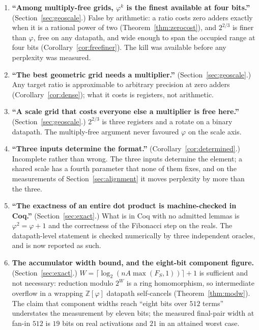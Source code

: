 \documentclass[11pt]{article}
\theoremstyle{definition}
\begin{document}
\begin{enumerate}[leftmargin=*,itemsep=3pt]

\item \textbf{``Among multiply-free grids, $\varphi^{k}$ is the finest available
at four bits.''} (Section~\ref{sec:geoscale}.) False by arithmetic: a ratio costs
zero adders exactly when it is a rational power of two
(Theorem~\ref{thm:zerocost}), and $2^{2/3}$ is finer than $\varphi$, free on any
datapath, and wide enough to span the occupied range at four bits
(Corollary~\ref{cor:freefiner}). The kill was available before any perplexity was
measured.

\item \textbf{``The best geometric grid needs a multiplier.''}
(Section~\ref{sec:geoscale}.) Any target ratio is approximable to arbitrary
precision at zero adders (Corollary~\ref{cor:dense}); what it costs is
registers, not arithmetic.

\item \textbf{``A scale grid that costs everyone else a multiplier is free
here.''} (Section~\ref{sec:geoscale}.) $2^{2/3}$ is three registers and a rotate
on a binary datapath. The multiply-free argument never favoured $\varphi$ on the
scale axis.

\item \textbf{``Three inputs determine the format.''}
(Corollary~\ref{cor:determined}.) Incomplete rather than wrong. The three inputs
determine the element; a shared scale has a fourth parameter that none of them
fixes, and on the measurements of Section~\ref{sec:alignment} it moves perplexity
by more than the three.

\item \textbf{``The exactness of an entire dot product is machine-checked in
Coq.''} (Section~\ref{sec:exact}.) What is in Coq with no admitted lemmas is
$\varphi^{2}=\varphi+1$ and the correctness of the Fibonacci step on the reals.
The datapath-level statement is checked numerically by three independent oracles,
and is now reported as such.

\item \textbf{The accumulator width bound, and the eight-bit component figure.}
(Section~\ref{sec:exact}.) $W = \lceil\log_2(nA\max(F_S,1))\rceil+1$ is
sufficient and not necessary: reduction modulo $2^{W}$ is a ring homomorphism, so
intermediate overflow in a wrapping $\mathbb{Z}[\varphi]$ datapath self-cancels
(Theorem~\ref{thm:modw}). The claim that component widths reach ``eight bits over
$512$ terms'' understates the measurement by eleven bits; the measured final-pair
width at fan-in $512$ is $19$ bits on real activations and $21$ in an attained
worst case.


\end{enumerate}
\end{document}
